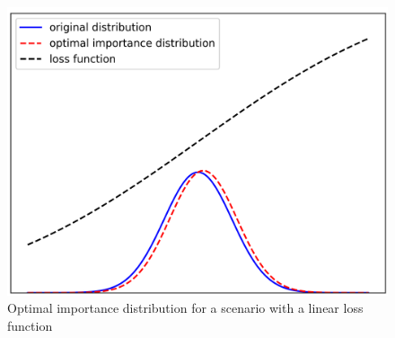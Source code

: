     \begin{figure}[H]
        \centering
        \includegraphics[scale=0.50]{Manuscript/Figures/Images/Methods/optimal_IS_dist_case2.png}
        \caption{Optimal importance distribution for a scenario with a linear loss function}
        \label{fig:optimal_IS_dist_case2}
    \end{figure}